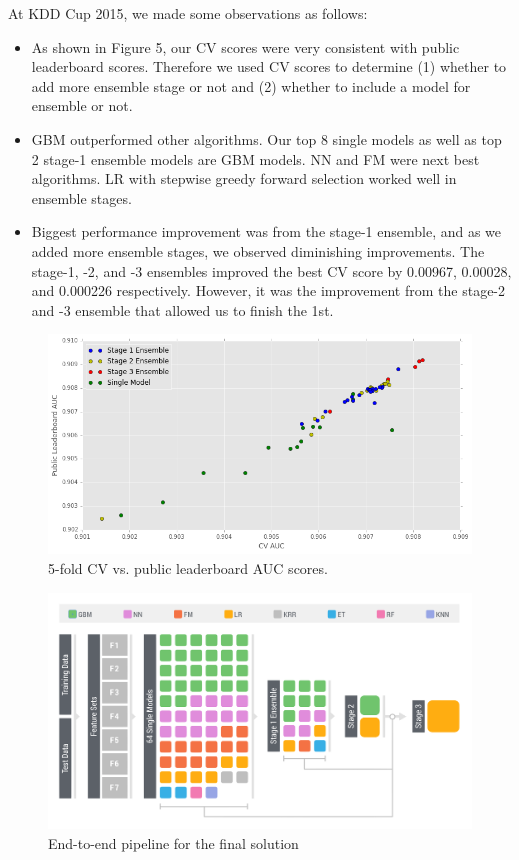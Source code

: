 At KDD Cup 2015, we made some observations as follows:
\begin{itemize}
\setlength\itemsep{0em}
\item As shown in Figure 5, our CV scores were very consistent with public leaderboard scores.  Therefore we used CV scores to determine (1) whether to add more ensemble stage or not and (2) whether to include a model for ensemble or not.
\item GBM outperformed other algorithms.  Our top 8 single models as well as top 2 stage-1 ensemble models are GBM models.  NN and FM were next best algorithms.  LR with stepwise greedy forward selection worked well in ensemble stages.
\item Biggest performance improvement was from the stage-1 ensemble, and as we added more ensemble stages, we observed diminishing improvements.  The stage-1, -2, and -3 ensembles improved the best CV score by 0.00967, 0.00028, and 0.000226 respectively.  However, it was the improvement from the stage-2 and -3 ensemble that allowed us to finish the 1st.
\end{itemize}

\begin{figure}[t]
  \centering
    \includegraphics[width=0.5 \textwidth]{cv_lb}
      \caption{5-fold CV vs. public leaderboard AUC scores.}
\end{figure}

\begin{figure}[!t]
  \centering
    \includegraphics[width=1 \textwidth]{ensemble}
      \caption{End-to-end pipeline for the final solution}
\end{figure}

